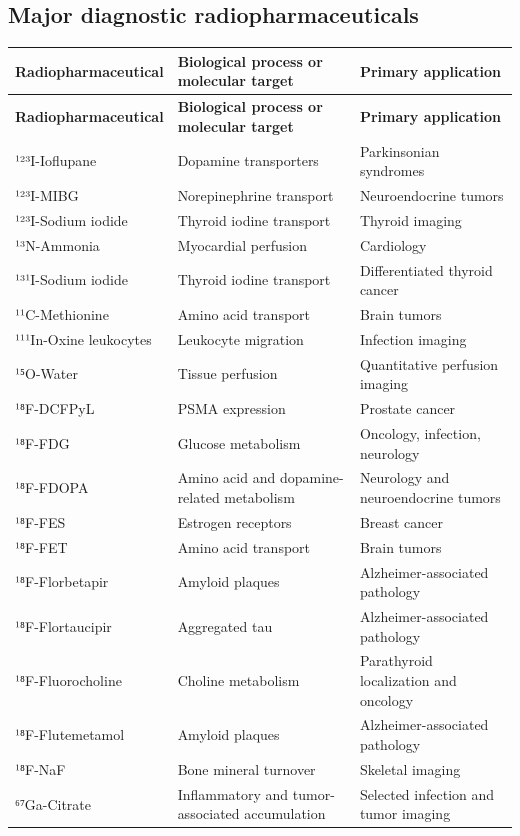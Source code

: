 \subsection{Major diagnostic radiopharmaceuticals}
\begin{longtable}{@{}p{}p{}p{}@{}}
\toprule
\textbf{Radiopharmaceutical} & \textbf{Biological process or molecular target} & \textbf{Primary application} \\
\midrule
\endfirsthead
\toprule
\textbf{Radiopharmaceutical} & \textbf{Biological process or molecular target} & \textbf{Primary application} \\
\midrule
\endhead
¹²³I-Ioflupane & Dopamine transporters & Parkinsonian syndromes \\
¹²³I-MIBG & Norepinephrine transport & Neuroendocrine tumors \\
¹²³I-Sodium iodide & Thyroid iodine transport & Thyroid imaging \\
¹³N-Ammonia & Myocardial perfusion & Cardiology \\
¹³¹I-Sodium iodide & Thyroid iodine transport & Differentiated thyroid cancer \\
¹¹C-Methionine & Amino acid transport & Brain tumors \\
¹¹¹In-Oxine leukocytes & Leukocyte migration & Infection imaging \\
¹⁵O-Water & Tissue perfusion & Quantitative perfusion imaging \\
¹⁸F-DCFPyL & PSMA expression & Prostate cancer \\
¹⁸F-FDG & Glucose metabolism & Oncology, infection, neurology \\
¹⁸F-FDOPA & Amino acid and dopamine-related metabolism & Neurology and neuroendocrine tumors \\
¹⁸F-FES & Estrogen receptors & Breast cancer \\
¹⁸F-FET & Amino acid transport & Brain tumors \\
¹⁸F-Florbetapir & Amyloid plaques & Alzheimer-associated pathology \\
¹⁸F-Flortaucipir & Aggregated tau & Alzheimer-associated pathology \\
¹⁸F-Fluorocholine & Choline metabolism & Parathyroid localization and oncology \\
¹⁸F-Flutemetamol & Amyloid plaques & Alzheimer-associated pathology \\
¹⁸F-NaF & Bone mineral turnover & Skeletal imaging \\
⁶⁷Ga-Citrate & Inflammatory and tumor-associated accumulation & Selected infection and tumor imaging \\

\end{longtable}
